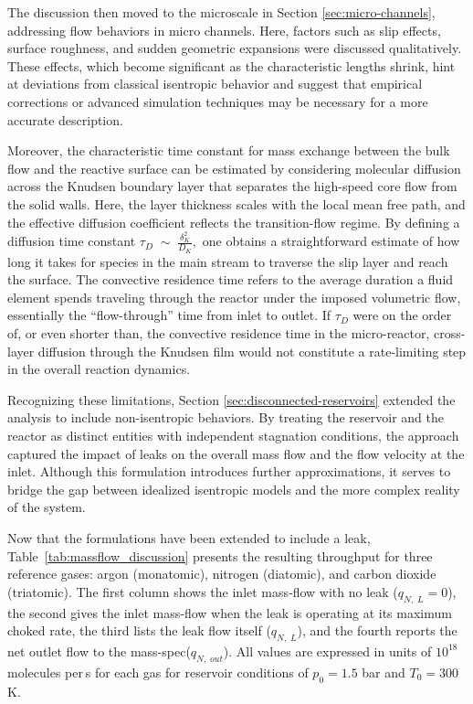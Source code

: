 The discussion then moved to the microscale in Section \ref{sec:micro-channels}, addressing flow behaviors in micro channels.
Here, factors such as slip effects, surface roughness, and sudden geometric expansions were discussed qualitatively.
These effects, which become significant as the characteristic lengths shrink, hint at deviations from classical isentropic behavior and suggest that empirical corrections or advanced simulation techniques may be necessary for a more accurate description.

Moreover, the characteristic time constant for mass exchange between the bulk flow and the reactive surface can be estimated by considering molecular diffusion across the Knudsen boundary layer that separates the high-speed core flow from the solid walls.
Here, the layer thickness scales with the local mean free path, and the effective diffusion coefficient reflects the transition-flow regime.
By defining a diffusion time constant $\tau_{D}\;\sim\;\frac{\delta_{K}^{2}}{D_{K}},$ one obtains a straightforward estimate of how long it takes for species in the main stream to traverse the slip layer and reach the surface.
The convective residence time refers to the average duration a fluid element spends traveling through the reactor under the imposed volumetric flow, essentially the “flow-through” time from inlet to outlet.
If $\tau_{D}$ were on the order of, or even shorter than, the convective residence time in the micro-reactor, cross-layer diffusion through the Knudsen film would not constitute a rate-limiting step in the overall reaction dynamics.

Recognizing these limitations, Section \ref{sec:disconnected-reservoirs} extended the analysis to include non-isentropic behaviors.
By treating the reservoir and the reactor as distinct entities with independent stagnation conditions, the approach captured the impact of leaks on the overall mass flow and the flow velocity at the inlet.
Although this formulation introduces further approximations, it serves to bridge the gap between idealized isentropic models and the more complex reality of the system.

Now that the formulations have been extended to include a leak, Table~\ref{tab:massflow_discussion} presents the resulting throughput for three reference gases: argon (monatomic), nitrogen (diatomic), and carbon dioxide (triatomic).
The first column shows the inlet mass‐flow with no leak ($q_{N,\;L}=0$), the second gives the inlet mass‐flow when the leak is operating at its maximum choked rate, the third lists the leak flow itself ($q_{N,\;L}$), and the fourth reports the net outlet flow to the mass-spec($q_{N,\;out}$).
All values are expressed in units of $10^{18}$ molecules per s for each gas for reservoir conditions of $p_0 = 1.5$ bar and $T_0 = 300$ K.

